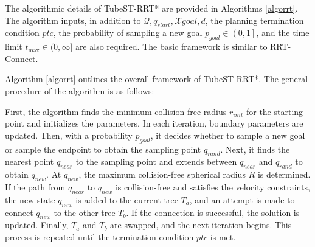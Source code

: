 \documentclass[conference]{IEEEtran}
\begin{document}
    The algorithmic details of TubeST-RRT* are provided in Algorithms \ref{algorrt}. The algorithm inputs, in addition to $\mathcal{Q}, q_{start}, \mathcal{X}{goal}, d$, the planning termination condition $ptc$, the probability of sampling a new goal $p_{goal} \in \left (0, 1 \right ]$, and the time limit $t_{\max} \in  (0, \infty ]$ are also required. The basic framework is similar to RRT-Connect. 

    Algorithm \ref{algorrt} outlines the overall framework of TubeST-RRT*. The general procedure of the algorithm is as follows:

    First, the algorithm finds the minimum collision-free radius \( r_{init} \) for the starting point and initializes the parameters. In each iteration, boundary parameters are updated. Then, with a probability \( p_{goal} \), it decides whether to sample a new goal or sample the endpoint to obtain the sampling point \( q_{rand} \). Next, it finds the nearest point \( q_{near} \) to the sampling point and extends between \( q_{near} \) and \( q_{rand} \) to obtain \( q_{new} \). At \( q_{new} \), the maximum collision-free spherical radius \( R \) is determined. If the path from \( q_{near} \) to \( q_{new} \) is collision-free and satisfies the velocity constraints, the new state \( q_{new} \) is added to the current tree \( T_{a} \), and an attempt is made to connect \( q_{new} \) to the other tree \( T_{b} \). If the connection is successful, the solution is updated. Finally, \( T_{a} \) and \( T_{b} \) are swapped, and the next iteration begins. This process is repeated until the termination condition \( ptc \) is met.
\end{document}

